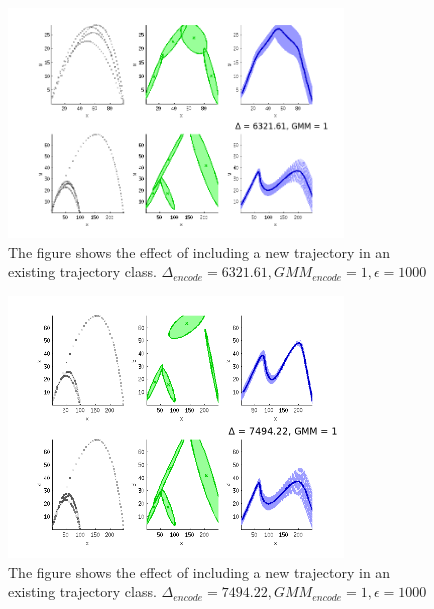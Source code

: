 \documentclass[conference]{IEEEtran}
\begin{document}
\begin{figure}[!t]
\centering
\includegraphics[width=3.5in]{fig5}
\caption{The figure shows the effect of including a new trajectory in an existing trajectory class. $\Delta_{encode} = 6321.61, GMM_{encode} = 1, \epsilon=1000$}
\label{fig:fig5}
\end{figure}

\begin{figure}[!t]
\centering
\includegraphics[width=3.5in]{fig6}
\caption{The figure shows the effect of including a new trajectory in an existing trajectory class. $\Delta_{encode} = 7494.22, GMM_{encode} = 1, \epsilon=1000$}
\label{fig:fig6}
\end{figure}
\end{document}
